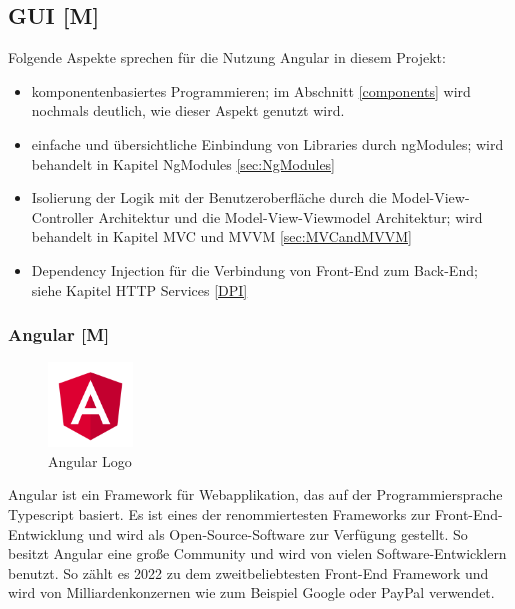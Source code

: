 \subsection{GUI [M]}
Folgende Aspekte sprechen für die Nutzung Angular in diesem Projekt:

\begin{itemize}
  \item komponentenbasiertes Programmieren;
  im Abschnitt \ref{components} wird nochmals deutlich, wie dieser Aspekt genutzt wird.
  \item einfache und übersichtliche Einbindung von Libraries durch ngModules; wird behandelt in Kapitel NgModules \ref{sec:NgModules} 
  \item Isolierung der Logik mit der Benutzeroberfläche durch die Model-View-Controller Architektur und die Model-View-Viewmodel Architektur; wird behandelt in Kapitel MVC und MVVM \ref{sec:MVCandMVVM} 
  \item 
  Dependency Injection für die Verbindung von Front-End zum Back-End; siehe Kapitel HTTP Services \ref{DPI}
\end{itemize}

\subsubsection{Angular [M]}
\begin{figure}
  \begin{center}
    \includegraphics[width=0.2\textwidth]{pics/AngularLogo.png}
   \caption{Angular Logo}
  \end{center}
\end{figure}
Angular ist ein Framework für Webapplikation, das auf der Programmiersprache Typescript basiert. Es ist eines der renommiertesten Frameworks zur Front-End-Entwicklung und wird als Open-Source-Software zur Verfügung gestellt. So besitzt Angular eine große Community und wird von vielen Software-Entwicklern benutzt. So zählt es 2022 zu dem zweitbeliebtesten Front-End Framework \cite{AngularEvidence} und wird von Milliardenkonzernen wie zum Beispiel Google oder PayPal verwendet. 
\cite{AngularEvidence2}

